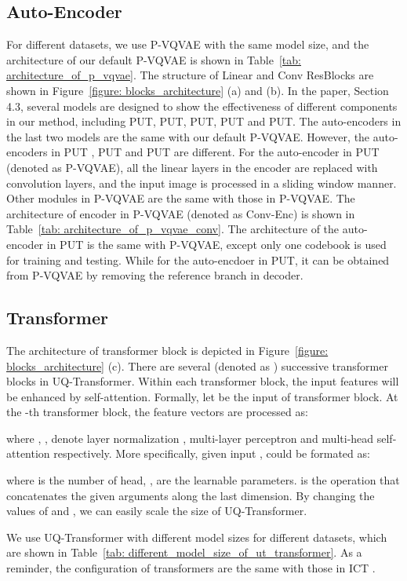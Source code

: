 \documentclass[10pt,twocolumn,letterpaper]{article}
\newcommand{\Tref}[1]{Table~\ref{#1}}
\newcommand{\Fref}[1]{Figure~\ref{#1}}
\begin{document}
\subsection{Auto-Encoder}
\label{sec: auto_encoder_architecture}
For different datasets, we use P-VQVAE with the same model size, and the architecture of our default P-VQVAE is shown in \Tref{tab: architecture_of_p_vqvae}. The structure of Linear and Conv ResBlocks are shown in \Fref{figure: blocks_architecture} (a) and (b). In the paper, Section 4.3, several models are designed to show the effectiveness of different components in our method, including PUT, PUT, PUT, PUT and PUT. The auto-encoders in the last two models are the same with our default P-VQVAE. However, the auto-encoders in PUT , PUT and PUT are different. For the auto-encoder in PUT (denoted as P-VQVAE), all the linear layers in the encoder are replaced with convolution layers, and the input image is processed in a sliding window manner. Other modules in P-VQVAE are the same with those in P-VQVAE. The architecture of encoder in P-VQVAE (denoted as Conv-Enc) is shown in \Tref{tab: architecture_of_p_vqvae_conv}. The architecture of the auto-encoder in PUT is the same with P-VQVAE, except only one codebook  is used for training and testing. While for the auto-encdoer in PUT, it can be obtained from P-VQVAE by removing the reference branch in decoder.



\subsection{Transformer}
The architecture of transformer block is depicted in \Fref{figure: blocks_architecture} (c).  There are several (denoted as ) successive transformer blocks in UQ-Transformer. Within each transformer block, the input features will be enhanced by self-attention. Formally, let  be the input of transformer block.
At the -th transformer block, the feature vectors are processed as:

where , ,  denote layer normalization \cite{ba2016layer}, multi-layer perceptron and multi-head self-attention respectively. More specifically, given input ,  could be formated as:

where  is the number of head, ,  are the learnable parameters.  is the operation that concatenates the given arguments along the last dimension. By changing the values of  and , we can easily scale the size of UQ-Transformer.

We use UQ-Transformer with different model sizes for different datasets, which are shown in \Tref{tab: different_model_size_of_ut_transformer}. As a reminder, the configuration of transformers are the same with those in ICT \cite{wan2021high}.
\end{document}

